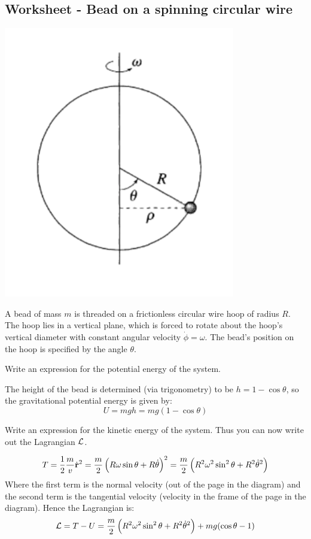 \subsection{Worksheet - Bead on a spinning circular wire}
\begin{center}
\includegraphics[scale=1]{Lecture-5/W5-img1.png}
\end{center}
A bead of mass $m$ is threaded on a frictionless circular wire hoop of radius $R$. The hoop lies in a vertical plane, which is forced to rotate about the hoop's vertical diameter with constant angular velocity $\dot{\phi} = \omega$. The bead's position on the hoop is specified by the angle $\theta$.

\begin{p}
Write an expression for the potential energy of the system.
\end{p}
\begin{s}
The height of the bead is determined (via trigonometry) to be $h = 1 - \cos\theta$, so the gravitational potential energy is given by:
\[U = mgh = mg(1-\cos\theta)\]
\end{s}

\begin{p}
Write an expression for the kinetic energy of the system. Thus you can now write out the Lagrangian $\mathcal{L}$.
\end{p}
\begin{s}
\[T = \frac{1}{2}\frac{m}{v}\dot{\mathbf{r}}^2 = \frac{m}{2}\left(R\omega\sin\theta + R\dot{\theta}\right)^2 = \frac{m}{2}\left(R^2\omega^2\sin^2\theta + R^2\dot{\theta}^2\right) \]
Where the first term is the normal velocity (out of the page in the diagram) and the second term is the tangential velocity (velocity in the frame of the page in the diagram). Hence the Lagrangian is:
\[\mathcal{L} = T - U = \frac{m}{2}\left(R^2\omega^2\sin^2\theta + R^2\dot{\theta}^2\right) +mg(\cos\theta-1)\] 
\end{s}

